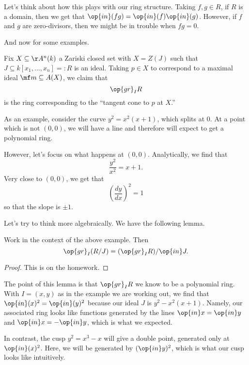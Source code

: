 Let's think about how this plays with our ring structure. Taking $f,g\in R$, if $R$ is a domain, then we get that $\op{in}(fg)=\op{in}(f)\op{in}(g)$. However, if $f$ and $g$ are zero-divisors, then we might be in trouble when $fg=0$.

And now for some examples.
\begin{example}
	Fix $X\subseteq\AA^n(k)$ a Zariski closed set with $X=Z(J)$ such that $J\subseteq k[x_1,\ldots,x_n]=:R$ is an ideal. Taking $p\in X$ to correspond to a maximal ideal $\mf m\subseteq A(X)$, we claim that
	\[\op{gr}_IR\]
	is the ring corresponding to the ``tangent cone to $p$ at $X$.''
\end{example}
As an example, consider the curve $y^2=x^2(x+1)$, which splits at $0$. %
At a point which is not $(0,0)$, we will have a line and therefore will expect to get a polynomial ring.

However, let's focus on what happens at $(0,0)$. Analytically, we find that
\[\frac{y^2}{x^2}=x+1.\]
Very close to $(0,0)$, we get that
\[\left(\frac{dy}{dx}\right)^2=1\]
so that the slope is $\pm1$.

Let's try to think more algebraically. We have the following lemma.
\begin{lemma}
	Work in the context of the above example. Then
	\[\op{gr}_I(R/J)=(\op{gr}_IR)/\op{in}J.\]
\end{lemma}
\begin{proof}
	This is on the homework.
\end{proof}
The point of this lemma is that $\op{gr}_IR$ we know to be a polynomial ring. With $I=(x,y)$ as in the example we are working out, we find that $\op{in}(x)^2=\op{in}(y)^2$ because our ideal $J$ is $y^2-x^2(x+1)$. Namely, our associated ring looks like functions generated by the lines $\op{in}x=\op{in}y$ and $\op{in}x=-\op{in}y$, which is what we expected.

In contrast, the cusp $y^2=x^3-x$ will give a double point, generated only at $\op{in}(x)^2$. Here, we will be generated by $(\op{in}y)^2$, which is what our cusp looks like intuitively.

